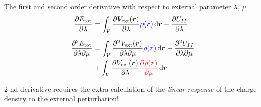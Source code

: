 \begin{frame}
  The first and second order derivative with respect to external parameter
  $\lambda$, $\mu$
   \begin{align}
    \frac{
      \partial E_{\text{tot}}
    }{
      \partial \lambda
    }
    &=
    \int_V
    \frac{
      \partial
      V_{\text{ext}}(\boldsymbol{r})
    }{
      \partial \lambda
    }
    \mathcolor{blue}{\rho(\boldsymbol{r})}
    \,\mathrm{d}\boldsymbol{r}
    +
    \frac{
      \partial
      U_{II}
    }{
      \partial \lambda
    } \label{eq:energy_1st_deriv}
    \\[6pt]
    \frac{
      \partial^2 E_{\text{tot}}
    }{
      \partial \lambda
      \partial \mu
    }
    &=
    \int_V
    \frac{
      \partial^2
      V_{\text{ext}}(\boldsymbol{r})
    }{
      \partial \lambda
      \partial \mu
    }
    \mathcolor{blue}{\rho(\boldsymbol{r})} \,\mathrm{d}\boldsymbol{r}
    +
    \frac{
      \partial^2 U_{II}
    }{
      \partial \lambda
      \partial \mu
    } \nonumber \\
    & +
    \int_V
    \frac{
      \partial
      V_{\text{ext}}(\boldsymbol{r})
    }{
      \partial \lambda
    }
    \mathcolor{red}{
      \frac{
        \partial
        \rho(\boldsymbol{r})
      }{
        \partial \mu
      }
    }
    \,\mathrm{d}\boldsymbol{r} \label{eq:energy_2nd_deriv}
  \end{align}

  2-nd derivative requires the extra calculation of the \textit{linear response}
  of the charge density to the external perturbation!

\end{frame}

